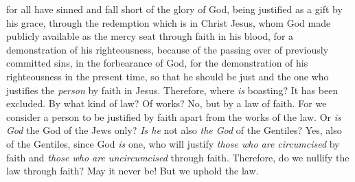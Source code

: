 \begin{biblechapter}
\verse for all have sinned and fall short of the glory of God,
\verse being justified as a gift by his grace, through the redemption which is in Christ Jesus,
\verse whom God made publicly available as the mercy seat through faith in his blood, for a demonstration of his righteousness, because of the passing over of previously committed sins,
\verse in the forbearance of God, for the demonstration of his righteousness in the present time, so that he should be just and the one who justifies the \textit{person} by faith in Jesus.
\verse Therefore, where \textit{is} boasting? It has been excluded. By what kind of law? Of works? No, but by a law of faith.
\verse For we consider a person to be justified by faith apart from the works of the law.
\verse Or \textit{is God} the God of the Jews only? \textit{Is he} not also \textit{the God} of the Gentiles? Yes, also of the Gentiles,
\verse since God \textit{is} one, who will justify \textit{those who are circumcised} by faith and \textit{those who are uncircumcised} through faith.
\verse Therefore, do we nullify the law through faith? May it never be! But we uphold the law.
\end{biblechapter}

